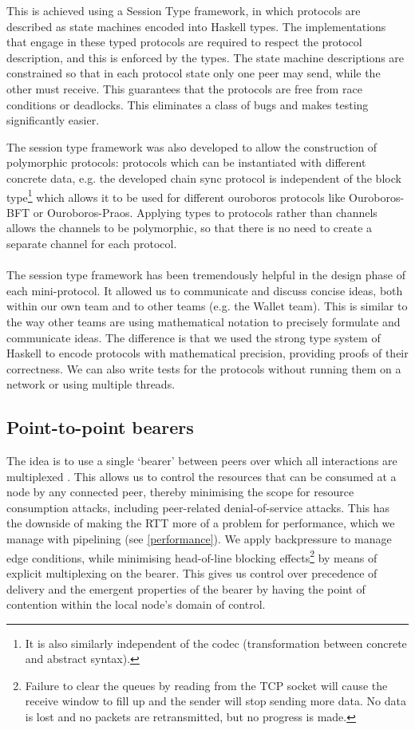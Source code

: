 \documentclass[11pt,a4paper]{article}
\begin{document}
This is achieved using a Session Type framework, in which protocols are
described as state machines encoded into Haskell types. The
implementations that engage in these typed protocols are required to
respect the protocol description, and this is enforced by the types. The
state machine descriptions are constrained so that in each protocol
state only one peer may send, while the other must receive. This
guarantees that the protocols are free from race conditions or
deadlocks. This eliminates a class of bugs and makes testing
significantly easier.

The session type framework was also developed to allow the construction
of polymorphic protocols: protocols which can be instantiated with
different concrete data, e.g. the developed chain sync protocol is
independent of the block type\footnote{It is also similarly independent
  of the codec (transformation between concrete and abstract syntax).}
which allows it to be used for different ouroboros protocols like
Ouroboros-BFT or Ouroboros-Praos. Applying types to protocols rather
than channels allows the channels to be polymorphic, so that there is no
need to create a separate channel for each protocol.\\
~\\
The session type framework has been tremendously helpful in the design
phase of each mini-protocol. It allowed us to communicate and discuss
concise ideas, both within our own team and to other teams (e.g. the
Wallet team). This is similar to the way other teams are using
mathematical notation to precisely formulate and communicate ideas. The
difference is that we used the strong type system of Haskell to encode
protocols with mathematical precision, providing proofs of their
correctness. We can also write tests for the protocols without running
them on a network or using multiple threads.

\subsection{Point-to-point bearers}
\label{point-to-point-bearers}

The idea is to use a single `bearer' between peers over which all
interactions are multiplexed . This allows us to control the resources
that can be consumed at a node by any connected peer, thereby minimising
the scope for resource consumption attacks, including peer-related
denial-of-service attacks. This has the downside of making the RTT more
of a problem for performance, which we manage with pipelining (see
\cref{performance}). We apply backpressure to
manage edge conditions, while minimising head-of-line blocking
effects\footnote{Failure to clear the queues by reading from the TCP
  socket will cause the receive window to fill up and the sender will
  stop sending more data. No data is lost and no packets are
  retransmitted, but no progress is made.} by means of explicit
multiplexing on the bearer. This gives us control over precedence of
delivery and the emergent properties of the bearer by having the point
of contention within the local node's domain of control.
\end{document}
